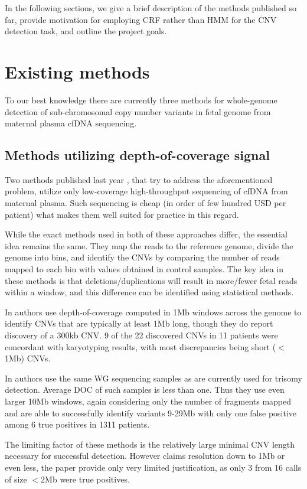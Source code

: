 In the following sections, we give a brief description of the methods published so far, provide motivation for employing CRF rather than HMM for the CNV detection task, and outline the project goals.

\section{Existing methods}
To our best knowledge there are currently three methods for whole-genome detection of sub-chromosomal copy number variants in fetal genome from maternal plasma cfDNA sequencing.

\subsection{Methods utilizing depth-of-coverage signal}
Two methods published last year \citep{chen2013, srinivasan2013}, that try to address the aforementioned problem, utilize only low-coverage high-throughput sequencing of cfDNA from maternal plasma. Such sequencing is cheap (in order of few hundred USD per patient) what makes them well suited for practice in this regard.

While the exact methods used in both of these approaches differ, the essential idea remains the same. They map the reads to the reference genome, divide the genome into bins, and identify the CNVs by comparing the number of reads mapped to each bin with values obtained in control samples. The key idea in these methods is that deletions/duplications will result in more/fewer fetal reads within a window, and this difference can be identified using statistical methods.

In \cite{srinivasan2013} authors use depth-of-coverage computed in 1Mb windows across the genome to identify CNVs that are typically at least 1Mb long, though they do report discovery of a 300kb CNV. 9 of the 22 discovered CNVs in 11 patients were concordant with karyotyping results, with most discrepancies being short ($<$1Mb) CNVs.

In \cite{chen2013} authors use the same WG sequencing samples as are currently used for trisomy detection. Average DOC of such samples is less than one. Thus they use even larger 10Mb windows, again considering only the number of fragments mapped and are able to successfully identify variants 9-29Mb with only one false positive among 6 true positives in 1311 patients.

The limiting factor of these methods is the relatively large minimal CNV length  necessary for successful detection. However \cite{srinivasan2013} claims resolution down to 1Mb or even less, the paper provide only very limited justification, as only 3 from 16 calls of size $<$2Mb were true positives.

